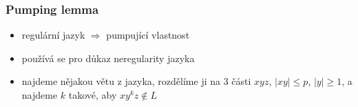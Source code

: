 \subsubsection*{Pumping lemma}
\begin{itemize}
	\item regulární jazyk $\Rightarrow$ pumpující vlastnost
	\item používá se pro důkaz neregularity jazyka
	\item najdeme nějakou větu z jazyka, rozdělíme ji na 3 části $xyz$, $|xy| \leq p$, $|y| \geq 1$, a najdeme $k$ takové, aby $xy^k z \not\in L$
\end{itemize}
